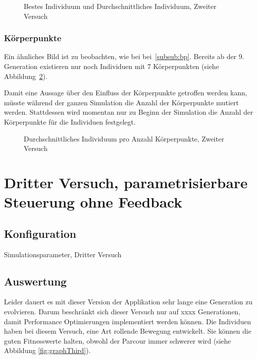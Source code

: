         \begin{figure}
          
          \caption{Bestes Individuum und Durchschnittliches Individuum, Zweiter Versuch\label{fig:graphSecond}}
        \end{figure}

      \subsubsection{Körperpunkte\label{subsub:bpScnd}}

        Ein ähnliches Bild ist zu beobachten, wie bei bei~\ref{subsub:bp}.
        Bereits ab der 9\@. Generation existieren nur noch Individuen mit 7 Körperpunkten (siehe Abbildung~\ref{fig:graphBpSecond}).

        Damit eine Aussage über den Einfluss der Körperpunkte getroffen werden kann,
        müsste während der ganzen Simulation die Anzahl der Körperpunkte mutiert werden.
        Stattdessen wird momentan nur zu Beginn der Simulation die Anzahl der Körperpunkte für die Individuen festgelegt.

        \begin{figure}
          
          \caption{Durchschnittliches Individuum pro Anzahl Körperpunkte, Zweiter Versuch\label{fig:graphBpSecond}}
        \end{figure}

    \section{Dritter Versuch, parametrisierbare Steuerung ohne Feedback}

      \subsection{Konfiguration}

        \begin{table}[H]
          
          \caption{Simulationsparameter, Dritter Versuch}
        \end{table}

      \subsection{Auswertung}
        Leider dauert es mit dieser Version der Applikation sehr lange eine Generation zu evolvieren.
        Darum beschränkt sich dieser Versuch nur auf xxxx Generationen, damit Performance Optimierungen implementiert werden können.
        Die Individuen haben bei diesem Versuch, eine Art rollende Bewegung entwickelt.
        Sie können die guten Fitnesswerte halten, obwohl der Parcour immer schwerer wird (siehe Abbildung \ref{fig:graphThird}).


